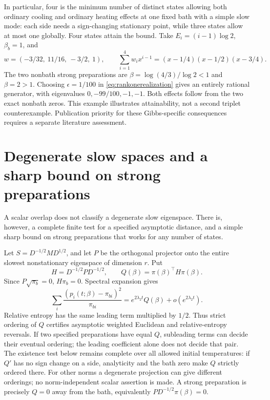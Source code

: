 \documentclass[11pt]{article}
\begin{document}
In particular, four is the minimum number of distinct states allowing both
ordinary cooling and ordinary heating effects at one fixed bath with a simple
slow mode: each side needs a sign-changing stationary point, while three states
allow at most one globally. Four states attain the bound. Take
$E_i=(i-1)\log2$, $\beta_b=1$, and
\[
w=(-3/32,\ 11/16,\ -3/2,\ 1),\qquad
\sum_{i=1}^4w_i x^{i-1}=(x-1/4)(x-1/2)(x-3/4).
\]
The two nonbath strong preparations are
$\beta=\log(4/3)/\log2<1$ and $\beta=2>1$. Choosing $\epsilon=1/100$
in \eqref{eq:rankonerealization} gives an entirely rational generator, with
eigenvalues $0,-99/100,-1,-1$. Both effects follow from the two exact nonbath
zeros. This example illustrates attainability, not a second triplet
counterexample. Publication priority for these Gibbs-specific consequences
requires a separate literature assessment.

\section{Degenerate slow spaces and a sharp bound on strong preparations}\label{sec:degenerateextension}
A scalar overlap does not classify a degenerate slow eigenspace. There is,
however, a complete finite test for a specified asymptotic distance, and a
simple sharp bound on strong preparations that works for any number of states.

Let $S=D^{-1/2}MD^{1/2}$, and let $P$ be the orthogonal projector onto the
entire slowest nonstationary eigenspace of dimension $r$. Put
\[
H=D^{-1/2}PD^{-1/2},\qquad
Q(\beta)=\pi(\beta)^\top H\pi(\beta).
\]
Since $P\sqrt{\pi_b}=0$, $H\pi_b=0$. Spectral expansion gives
\[
\sum_i\frac{(p_i(t;\beta)-\pi_{bi})^2}{\pi_{bi}}
=e^{2\lambda_2t}Q(\beta)+o(e^{2\lambda_2t}).
\]
Relative entropy has the same leading term multiplied by $1/2$. Thus strict
ordering of $Q$ certifies asymptotic weighted Euclidean and relative-entropy
reversals. If two specified preparations have equal $Q$, subleading terms can
decide their eventual ordering; the leading coefficient alone does not decide
that pair. The existence test below remains complete over all allowed initial
temperatures: if $Q'$ has no sign change on a side, analyticity and the bath
zero make $Q$ strictly ordered there. For other norms a degenerate projection can give different orderings;
no norm-independent scalar assertion is made. A strong preparation is precisely
$Q=0$ away from the bath, equivalently $PD^{-1/2}\pi(\beta)=0$.
\end{document}
